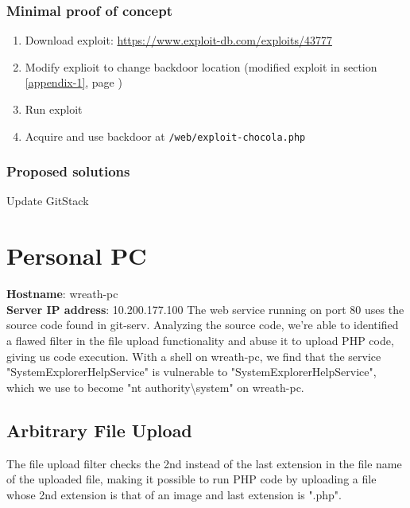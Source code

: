 \subsubsection{Minimal proof of concept}
\begin{enumerate}
  \item Download exploit: \href{https://www.exploit-db.com/exploits/43777}{https://www.exploit-db.com/exploits/43777}
  \item Modify explioit to change backdoor location (modified exploit in section \ref{appendix-1}, page \pageref{appendix-1})
  \item Run exploit
  \item Acquire and use backdoor at \lstinline{/web/exploit-chocola.php}
\end{enumerate}

\subsubsection{Proposed solutions} \label{solution:issue-2}
Update GitStack

\newpage

\section{Personal PC}
\textbf{Hostname}: wreath-pc\\
\textbf{Server IP address}: 10.200.177.100
The web service running on port 80 uses the source code found in git-serv. Analyzing the source code, we're able to identified a flawed filter in the file upload functionality and abuse it to upload PHP code, giving us code execution. With a shell on wreath-pc, we find that the service "SystemExplorerHelpService" is vulnerable to "SystemExplorerHelpService", which we use to become "nt authority\textbackslash system" on wreath-pc.

\subsection{Arbitrary File Upload} \label{ss:issue-3}
The file upload filter checks the 2nd instead of the last extension in the file name of the uploaded file, making it possible to run PHP code by uploading a file whose 2nd extension is that of an image and last extension is ".php".

